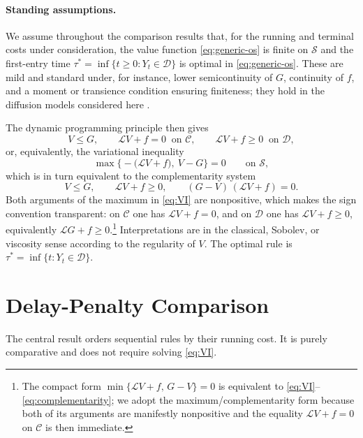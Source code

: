 \documentclass[pdflatex,sn-mathphys-num]{sn-jnl}
\theoremstyle{plain}
\theoremstyle{definition}
\newcommand{\Lgen}{\mathscr{L}}
\begin{document}
\paragraph{Standing assumptions.}
We assume throughout the comparison results that, for the running and terminal
costs under consideration, the value function \eqref{eq:generic-os} is finite on
$\mathcal S$ and the first-entry time
$\tau^\ast=\inf\{t\ge0:Y_t\in\mathcal D\}$ is optimal in \eqref{eq:generic-os}.
These are mild and standard under, for instance, lower semicontinuity of $G$,
continuity of $f$, and a moment or transience condition ensuring finiteness; they
hold in the diffusion models considered here \citep{peskir2006optimal}.

The dynamic programming principle then gives
\begin{equation}\label{eq:dpp}
  V\le G,\qquad \Lgen V+f=0\ \text{ on }\mathcal C,\qquad
  \Lgen V+f\ge0\ \text{ on }\mathcal D,
\end{equation}
or, equivalently, the variational inequality
\begin{equation}\label{eq:VI}
  \max\big\{-\big(\Lgen V+f\big),\ V-G\big\}=0\qquad\text{on }\mathcal S,
\end{equation}
which is in turn equivalent to the complementarity system
\begin{equation}\label{eq:complementarity}
  V\le G,\qquad \Lgen V+f\ge0,\qquad (G-V)\,(\Lgen V+f)=0 .
\end{equation}
Both arguments of the maximum in \eqref{eq:VI} are nonpositive, which makes the
sign convention transparent: on $\mathcal C$ one has $\Lgen V+f=0$, and on
$\mathcal D$ one has $\Lgen V+f\ge0$, equivalently $\Lgen G+f\ge0$.\footnote{The
compact form $\min\{\Lgen V+f,\,G-V\}=0$ is equivalent to
\eqref{eq:VI}--\eqref{eq:complementarity}; we adopt the maximum/complementarity
form because both of its arguments are manifestly nonpositive and the equality
$\Lgen V+f=0$ on $\mathcal C$ is then immediate.} Interpretations are in the
classical, Sobolev, or viscosity sense according to the regularity of $V$. The
optimal rule is $\tau^\ast=\inf\{t:Y_t\in\mathcal D\}$.

\section{Delay-Penalty Comparison}\label{sec:comparison}

The central result orders sequential rules by their running cost. It is purely
comparative and does not require solving \eqref{eq:VI}.
\end{document}
